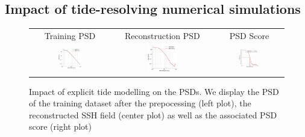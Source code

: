 \documentclass[draft]{agujournal2019}
\begin{document}
\subsection{Impact of tide-resolving numerical simulations}
\label{ssec:tide}
\begin{figure}[H]
\small
\begin{center}
\setlength{\tabcolsep}{1pt}
\begin{tabular}{ccc}

\hspace{3mm} Training PSD & 
\hspace{3mm} Reconstruction PSD & 
\hspace{3mm} PSD Score  \\


\includegraphics[width=0.31\textwidth]{figures/plots2/isotrop_psd_tide_train.png} &
\includegraphics[width=0.31\textwidth]{figures/plots2/isotrop_psd_tide_rec.png} &
\includegraphics[width=0.31\textwidth]{figures/plots2/tide_1d_psd_score.png}


\end{tabular}
\vspace{-3mm}
\caption{
Impact of explicit tide modelling on the PSDs. We display the PSD of the training dataset after the prepocessing (left plot), the reconstructed SSH field (center plot) as well as the associated PSD score (right plot)}\vspace{-5mm}
\label{fig:tidepsd}
\end{center}
\end{figure}
\end{document}

